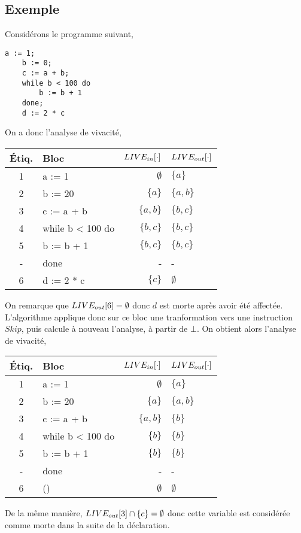 \documentclass[a4paper, 11pt]{article}
\begin{document}
\subsection{Exemple}
\noindent
Considérons le programme suivant,
\begin{lstlisting}[tabsize=2]
	a := 1;
	b := 0;
	c := a + b;
	while b < 100 do
		b := b + 1
	done;
	d := 2 * c
\end{lstlisting}
On a donc l'analyse de vivacité,
\begin{center}
\begin{tabular}{||c|l|r|l||}
\hline
Étiq. & Bloc & $LIVE_{in}[\cdot]$ & $LIVE_{out}[\cdot]$ \\
\hline
1 & a := 1 & $\emptyset$ & $\{a\}$\\
2 & b := 20 & $\{a\}$ & $\{a, b\}$\\
3 & c := a + b & $\{a, b\}$ & $\{b, c\}$\\
4 & while b < 100 do & $\{b, c\}$ & $\{b, c\}$\\
5 & b := b + 1 & $\{b, c\}$ & $\{b, c\}$\\
- & done & - & -\\
6 & d := 2 * c & $\{c\}$ & $\emptyset$\\
\hline
\end{tabular}
\end{center}
On remarque que $LIVE_{out}[6] = \emptyset$ donc $d$ est morte après avoir été affectée. L'algorithme applique donc sur ce bloc
une tranformation vers une instruction $Skip$, puis calcule à nouveau l'analyse, à partir de $\bot$. On obtient alors l'analyse
de vivacité,
\begin{center}
	\begin{tabular}{||c|l|r|l||}
	\hline
	Étiq. & Bloc & $LIVE_{in}[\cdot]$ & $LIVE_{out}[\cdot]$ \\
	\hline
	1 & a := 1 & $\emptyset$ & $\{a\}$\\
	2 & b := 20 & $\{a\}$ & $\{a, b\}$\\
	3 & c := a + b & $\{a, b\}$ & $\{b\}$\\
	4 & while b < 100 do & $\{b\}$ & $\{b\}$\\
	5 & b := b + 1 & $\{b\}$ & $\{b\}$\\
	- & done & - & -\\
	6 & () & $\emptyset$ & $\emptyset$\\
	\hline
	\end{tabular}
\end{center}
De la même manière, $LIVE_{out}[3] \cap \{c\} = \emptyset$ donc cette variable est considérée comme morte dans la suite de la déclaration.
\end{document}
